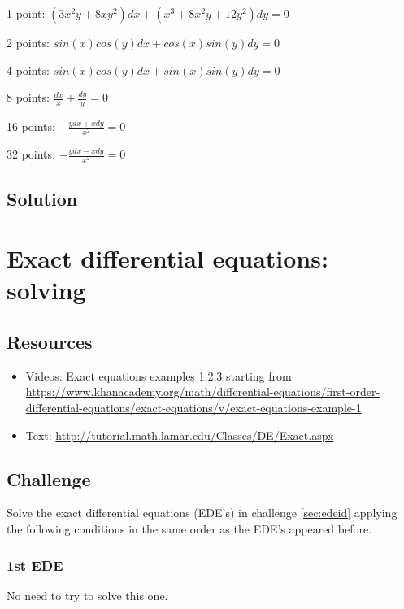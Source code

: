 1 point: $\displaystyle (3x^2y+8xy^2) dx + (x^3 + 8x^2y + 12 y^2) dy = 0$ %

2 points: $\displaystyle sin(x) cos(y) dx + cos(x) sin(y) dy = 0$ %

4 points: $\displaystyle sin(x) cos(y) dx + sin(x) sin(y) dy = 0$ %

8 points: $\displaystyle \frac{dx}{x} + \frac{dy}{y} = 0$ %

16 points: $\displaystyle -\frac{y dx + x dy}{x^2} = 0 $ %

32 points: $\displaystyle -\frac{y dx - x dy}{x^2} = 0$ %


\subsection*{Solution}
\six{}


\timebox



\newpage
\section{Exact differential equations: solving}

\subsection*{Resources}
\begin{itemize}
    \item Videos: Exact equations examples 1,2,3 starting from \url{https://www.khanacademy.org/math/differential-equations/first-order-differential-equations/exact-equations/v/exact-equations-example-1}
    \item Text: \url{http://tutorial.math.lamar.edu/Classes/DE/Exact.aspx}
\end{itemize}

\subsection*{Challenge}
Solve the exact differential equations (EDE's) in challenge \ref{sec:edeid} applying the following conditions in the same order as the EDE's appeared before.

\subsubsection{1st EDE}
No need to try to solve this one.

